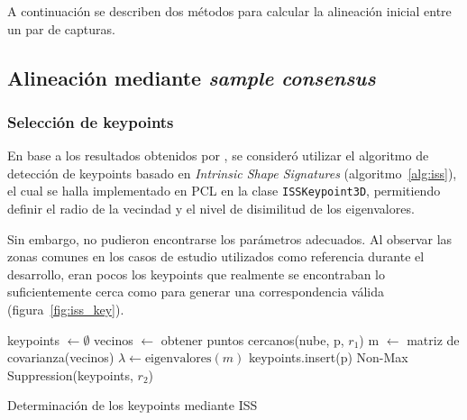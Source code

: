 	A continuación se describen dos métodos para calcular la alineación inicial entre un par de capturas. 

	\subsection{Alineación mediante \emph{sample consensus}}
		\subsubsection{Selección de keypoints}
			En base a los resultados obtenidos por \cite{ISS},
			se consideró utilizar el algoritmo de detección de keypoints basado en \emph{Intrinsic Shape Signatures} (algoritmo~\ref{alg:iss}),
			el cual se halla implementado en PCL en la clase \texttt{ISSKeypoint3D}, permitiendo
			definir el radio de la vecindad y el nivel de disimilitud de los eigenvalores.


			Sin embargo, no pudieron encontrarse los parámetros adecuados.
			Al observar las zonas comunes en los casos de estudio
			utilizados como referencia durante el desarrollo,
			eran pocos los keypoints que
			realmente se encontraban lo suficientemente cerca como para generar
			una correspondencia válida (figura~\ref{fig:iss_key}).



			\begin{algorithm}
				\begin{algorithmic}[1]
						\State keypoints $\gets\emptyset$
							\State vecinos $\gets$ obtener puntos cercanos(nube, p, $r_1$)
							\State m $\gets$ matriz de covarianza(vecinos)
							\State $\lambda\gets\text{eigenvalores}(m)$
								\State keypoints.insert(p)
							\EndIf
						\EndFor
						\State\Return Non-Max Suppression(keypoints, $r_2$)
					\EndFunction
				\end{algorithmic}
				\caption{\label{alg:iss}Determinación de los keypoints mediante ISS}
			\end{algorithm}


